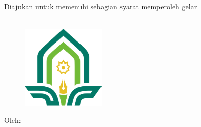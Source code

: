 %

%
%

\begin{titlepage}
    \begin{center}

        \vspace*{1.0cm}
        \bo{\Judul} \\[1.0cm]

        \vspace*{0.5cm}
        \bo{\MakeUppercase{\Type}} \\

        \vspace*{1cm}
        Diajukan untuk memenuhi sebagian syarat memperoleh gelar \\
        \gelar\\

        \vspace*{1cm}
        \begin{figure}
            \begin{center}
                \includegraphics[width=4cm]{assets/pics/logo-color.ps}
            \end{center}
        \end{figure}

        \vspace*{1cm}
        Oleh:\\
        \underline{\bo{\Penulis}} \\
         \\

        \vfill

    \end{center}
\end{titlepage}

